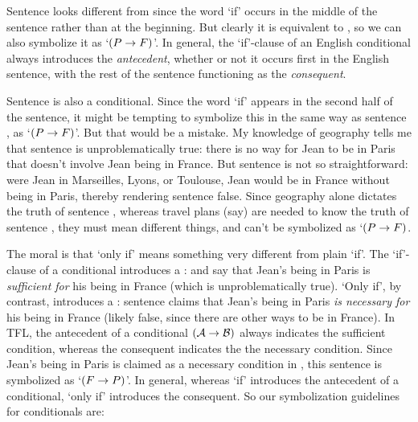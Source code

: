 Sentence  looks different from  since the word `if' occurs in the middle of the sentence rather than at the beginning.  But clearly  it is equivalent to , so we can also symbolize it as `$(P \rightarrow F)$'.  In general, the `if'-clause of an English conditional always introduces the \emph{antecedent}, whether or not it occurs first in the English sentence, with the rest of the sentence functioning as the \emph{consequent}.  


Sentence  is also a conditional. Since the word `if' appears in the second half of the sentence, it might be tempting to symbolize this in the same way as sentence , as `$(P \rightarrow F)$'. But that would be a mistake. My knowledge of geography tells me that sentence  is unproblematically true: there is no way for Jean to be in Paris that doesn't involve Jean being in France. But sentence  is not so straightforward: were  Jean in Marseilles, Lyons, or Toulouse, Jean would be in France without being in Paris, thereby rendering sentence  false. Since geography alone dictates the truth of sentence , whereas travel plans (say) are needed to know the truth of sentence , they must mean different things, and  can't be symbolized as `$(P \rightarrow F)$.

The moral is that `only if' means something very different from plain `if'.  The `if'-clause of a conditional introduces a :  and  say that Jean's being in Paris is \emph{sufficient for} his being in France (which is unproblematically true).  `Only if', by contrast, introduces a : sentence  claims that Jean's being in Paris \emph{is necessary for} his being in France (likely false, since there are other ways to be in France). In TFL, the antecedent  of a conditional $(\mathcal{A} \rightarrow \mathcal{B})$ always indicates the sufficient condition, whereas the consequent  indicates the the necessary condition.  Since Jean's being in Paris is claimed as a necessary condition in , this sentence is symbolized as `$(F \rightarrow P)$'.  In general, whereas `if' introduces the antecedent of a conditional, `only if' introduces the consequent.  So our symbolization guidelines for conditionals are:


